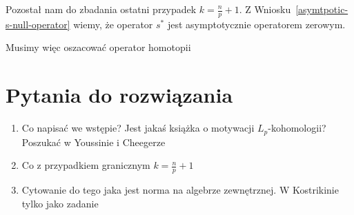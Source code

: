 \documentclass[licencjacka]{pracamgr}
\theoremstyle{definition}
\theoremstyle{definition}
\theoremstyle{plain}
\theoremstyle{plain}
\theoremstyle{plain}
\theoremstyle{plain}
\def\cfm{\ensuremath\mathrm{C}^fM}
\def\M{\ensuremath M}
\begin{document}
Pozostał nam do zbadania ostatni przypadek
$k = \frac{n}{p} + 1$.
Z Wniosku~\ref{asymtpotic-s-null-operator} wiemy, że operator $s^\ast$ jest
asymptotycznie operatorem zerowym. 

Musimy więc oszacować operator homotopii

\section{Pytania do rozwiązania}
\begin{enumerate}
\item Co napisać we wstępie? Jest jakaś książka o motywacji $L_p$-kohomologii?
Poszukać w Youssinie i Cheegerze
\item  Co z przypadkiem granicznym $k = \frac{n}{p} + 1$
\item Cytowanie do tego jaka jest norma na algebrze zewnętrznej. W Kostrikinie
tylko jako zadanie
\end{enumerate}


\end{document}
